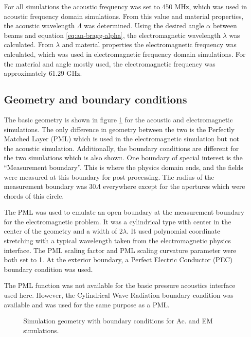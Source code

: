\documentclass[11pt,twoside]{eitExjobb}
\begin{document}
	For all simulations the acoustic frequency was set to 450 MHz, which was used in acoustic frequency domain simulations. From this value and material properties, the acoustic wavelength $\Lambda$ was determined. Using the desired angle $\alpha$ between beams and equation \eqref{eq:an-bragg-alpha}, the electromagnetic wavelength $\lambda$ was calculated. From $\lambda$ and material properties the electromagnetic frequency was calculated, which was used in electromagnetic frequency domain simulations. For the material and angle mostly used, the electromagnetic frequency was approximately 61.29 GHz.
	
	
	\subsection{Geometry and boundary conditions}
	The basic geometry is shown in figure \ref{fig:sim-geometry} for the acoustic and electromagnetic simulations. The only difference in geometry between the two is the Perfectly Matched Layer (PML) which is used in the electromagnetic simulation but not the acoustic simulation. Additionally, the boundary conditions are different for the two simulations which is also shown. One boundary of special interest is the ``Measurement boundary''. This is where the physics domain ends, and the fields were measured at this boundary for post-processing. The radius of the measurement boundary was $30\Lambda$ everywhere except for the apertures which were chords of this circle.
	
	The PML was used to emulate an open boundary at the measurement boundary for the electromagnetic problem. It was a cylindrical type with center in the center of the geometry and a width of $2\lambda$. It used polynomial coordinate stretching with a typical wavelength taken from the electromagnetic physics interface. The PML scaling factor and PML scaling curvature parameter were both set to 1. At the exterior boundary, a Perfect Electric Conductor (PEC) boundary condition was used.
	
	The PML function was not available for the basic pressure acoustics interface used here. However, the Cylindrical Wave Radiation boundary condition was available and was used for the same purpose as a PML.
	
	\begin{figure}
		\centering
		
		\vspace{5 mm}
		
		
		\caption{\label{fig:sim-geometry} Simulation geometry with boundary conditions for Ac. and EM simulations.}
	\end{figure}
	
\end{document}
